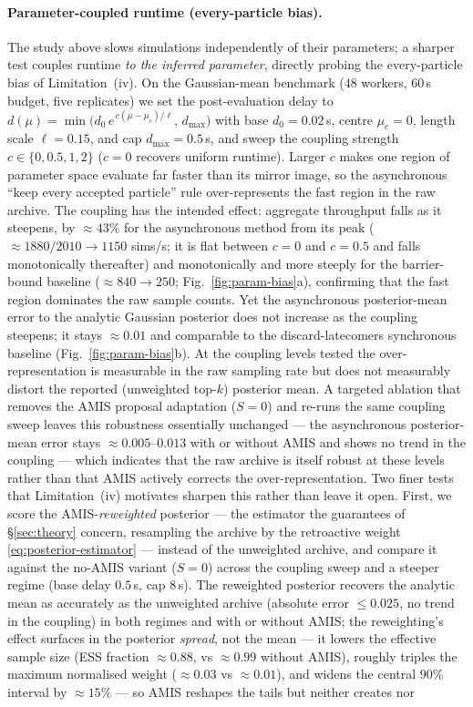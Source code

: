 \paragraph{Parameter-coupled runtime (every-particle bias).} The study above slows simulations independently of their parameters; a sharper test couples runtime \emph{to the inferred parameter}, directly probing the every-particle bias of Limitation~(iv). On the Gaussian-mean benchmark ($48$ workers, $60$\,s budget, five replicates) we set the post-evaluation delay to $d(\mu)=\min\!\big(d_0\,e^{\,c(\mu-\mu_c)/\ell},\,d_{\max}\big)$ with base $d_0=0.02$\,s, centre $\mu_c=0$, length scale $\ell=0.15$, and cap $d_{\max}=0.5$\,s, and sweep the coupling strength $c\in\{0,0.5,1,2\}$ ($c=0$ recovers uniform runtime). Larger $c$ makes one region of parameter space evaluate far faster than its mirror image, so the asynchronous ``keep every accepted particle'' rule over-represents the fast region in the raw archive. The coupling has the intended effect: aggregate throughput falls as it steepens, by ${\approx}43\%$ for the asynchronous method from its peak (${\approx}1880/2010 \to 1150$ sims/s; it is flat between $c=0$ and $c=0.5$ and falls monotonically thereafter) and monotonically and more steeply for the barrier-bound baseline (${\approx}840 \to 250$; Fig.~\ref{fig:param-bias}a), confirming that the fast region dominates the raw sample counts. Yet the asynchronous posterior-mean error to the analytic Gaussian posterior does not increase as the coupling steepens; it stays ${\approx}0.01$ and comparable to the discard-latecomers synchronous baseline (Fig.~\ref{fig:param-bias}b). At the coupling levels tested the over-representation is measurable in the raw sampling rate but does not measurably distort the reported (unweighted top-$k$) posterior mean. A targeted ablation that removes the AMIS proposal adaptation ($S{=}0$) and re-runs the same coupling sweep leaves this robustness essentially unchanged --- the asynchronous posterior-mean error stays ${\approx}0.005$--$0.013$ with or without AMIS and shows no trend in the coupling --- which indicates that the raw archive is itself robust at these levels rather than that AMIS actively corrects the over-representation. Two finer tests that Limitation~(iv) motivates sharpen this rather than leave it open. First, we score the AMIS-\emph{reweighted} posterior --- the estimator the guarantees of \S\ref{sec:theory} concern, resampling the archive by the retroactive weight \eqref{eq:posterior-estimator} --- instead of the unweighted archive, and compare it against the no-AMIS variant ($S{=}0$) across the coupling sweep and a steeper regime (base delay $0.5$\,s, cap $8$\,s). The reweighted posterior recovers the analytic mean as accurately as the unweighted archive (absolute error ${\le}0.025$, no trend in the coupling) in both regimes and with or without AMIS; the reweighting's effect surfaces in the posterior \emph{spread}, not the mean --- it lowers the effective sample size (ESS fraction ${\approx}0.88$, vs ${\approx}0.99$ without AMIS), roughly triples the maximum normalised weight (${\approx}0.03$ vs ${\approx}0.01$), and widens the central $90\%$ interval by ${\approx}15\%$ --- so AMIS reshapes the tails but neither creates nor 